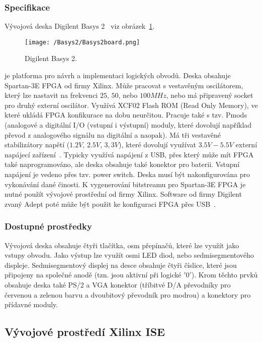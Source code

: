 \documentclass{report}
\begin{document}
\subsubsection{Specifikace}
Vývojová deska Digilent Basys 2~\cite{basys2rm} viz obrázek~\ref{fig:basys2}. 
\begin{figure}
\centering
\texttt{[image: /Basys2/Basys2board.png]}
\caption{Digilent Basys 2.}
\label{fig:basys2}
\end{figure}
je platforma pro návrh a implementaci logických obvodů. Deska obsahuje Spartan-3E FPGA od firmy Xilinx. Může pracovat s vestavěným oscilátorem, který lze nastavit na frekvenci $25$, $50$, nebo $100MHz$, nebo má připravený socket pro druhý externí oscilátor. Využívá XCF02 Flash ROM (Read Only Memory), ve které ukládá FPGA konfikurace na dobu neurčitou. Pracuje také s tzv. Pmods (analogové a digitální I/O (vstupní i výstupní) moduly, které dovolují například převod z analogového signálu na digitální a naopak). Má tři vestavěné stabilizátory napětí ($1.2V$, $2.5V$, $3,3V$), které dovolují využívat $3.5V-5.5V$ externí napájecí zařízení~\cite{basys2rm}. Typicky využívá napájení z USB, přes který může mít FPGA také naprogramováno, ale deska obsahuje také konektor pro baterii. Vstupní napájení je vedeno přes tzv. power switch. Deska musí být nakonfigurována pro vykonávání dané činosti. K vygenerování bitstreamu pro Spartan-3E FPGA je nutné použít vývojové prostřední od firmy Xilinx. Software od firmy Digilent zvaný Adept poté může být použit ke konfiguraci FPGA přes USB~\cite{basys2rm}.
\subsubsection{Dostupné prostředky}
Vývojová deska obsahuje čtyři tlačítka, osm přepínačů, které lze využít jako vstupy obvodu. Jako výstup lze využít osmi LED diod, nebo sedmisegmentového displeje. Sedmisegmentový displej na desce obsahuje čtyři číslice, které jsou připojeny na společné anodě (tzn. jsou aktivní při logické $'0'$). Krom těchto prvků obsahuje deska také PS/2 a VGA konektor (tříbitvé D/A převodníky pro červenou a zelenou barvu a dvoubitový převodník pro modrou) a konektory pro přídavné moduly.
\subsection{Vývojové prostředí Xilinx ISE}\label{sec:xilinxise}
\end{document}
